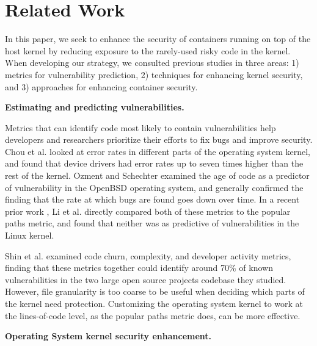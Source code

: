 \section{Related Work}
\label{sec.related_work}
In this paper, we seek to enhance the security of containers running on top of the host kernel by reducing exposure to the rarely-used risky code in the kernel. 
When developing our strategy, we consulted previous studies in three areas: 
1) metrics for vulnerability prediction, 2) techniques for enhancing kernel security, and 3) approaches for enhancing container security. 

\textbf{Estimating and predicting vulnerabilities.} 

Metrics that can identify code most likely to contain vulnerabilities help developers and researchers prioritize their efforts to fix bugs and improve security. 
Chou et al. \cite{Chou} looked at error rates in different parts of the operating system kernel, and found that device drivers had error rates up to seven times higher than the rest of the kernel. 
Ozment and Schechter \cite{Ozment} examined the age of code as a predictor of vulnerability in the OpenBSD \cite{OpenBSD} operating system, 
and generally confirmed the finding that the rate at which bugs are found goes down over time. 
In a recent prior work \cite{Lock-in-Pop}, Li et al. directly compared both of these metrics to the  popular paths metric, and found that neither was as predictive of vulnerabilities in the Linux kernel.

Shin et al. \cite{Shin:2011:ECC} examined code churn, complexity, and developer activity metrics, 
finding that these metrics together could identify around 70\% of known vulnerabilities in the two large open source projects codebase they studied. 
However, file granularity is too coarse to be useful when deciding which parts of the kernel need protection. 
Customizing the operating system kernel to work at the lines-of-code level, as the popular paths metric does, can be more effective. 

\textbf{Operating System kernel security enhancement.} 

